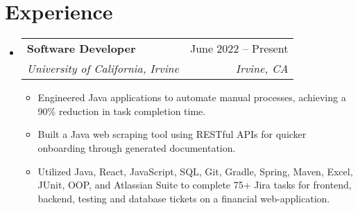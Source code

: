 \documentclass[letterpaper,11pt]{article}
\makeatletter
\newcommand{\resumeItem}[1]{
  \item\small{
    {#1 \vspace{-2pt}}
  }
}
\newcommand{\resumeSubheading}[4]{
  \vspace{-2pt}\item
    \begin{tabular*}{0.97\textwidth}[t]{l@{\extracolsep{\fill}}r}
      \textbf{#1} & #2 \\
      \textit{\small#3} & \textit{\small #4} \\
    \end{tabular*}\vspace{-7pt}
}
\newcommand{\resumeSubSubheading}[2]{
    \item
    \begin{tabular*}{0.97\textwidth}{l@{\extracolsep{\fill}}r}
      \textit{\small#1} & \textit{\small #2} \\
    \end{tabular*}\vspace{-7pt}
}
\newcommand{\resumeSubHeadingListStart}{\begin{itemize}[leftmargin=0.15in, label={}]}
\newcommand{\resumeSubHeadingListEnd}{\end{itemize}}
\newcommand{\resumeItemListStart}{\begin{itemize}}
\newcommand{\resumeItemListEnd}{\end{itemize}\vspace{-5pt}}
\makeatother
\begin{document}
\section{Experience}
  \resumeSubHeadingListStart

    \resumeSubheading
      {Software Developer}{June 2022 -- Present}
      {University of California, Irvine}{Irvine, CA}
      \resumeItemListStart
        \resumeItem{Engineered Java applications to automate manual processes, achieving a 90\% reduction in task completion time.}
        \resumeItem{Built a Java web scraping tool using RESTful APIs for quicker onboarding through generated documentation.
        }
        \resumeItem{Utilized Java, React, JavaScript, SQL, Git, Gradle, Spring, Maven, Excel, JUnit, OOP, and Atlassian Suite to complete 75+ Jira tasks for frontend, backend, testing and database tickets on a financial web-application. 
        }
      \resumeItemListEnd
      

  \resumeSubHeadingListEnd


\end{document}
